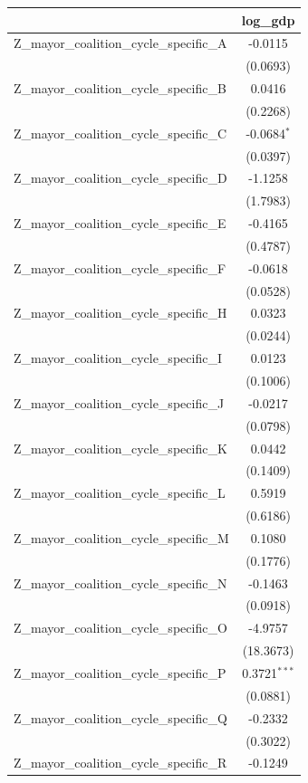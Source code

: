 \begin{tabular}{lc}
\toprule
 & log\_gdp \\
\midrule
Z\_mayor\_coalition\_cycle\_specific\_A & -0.0115 \\
 & (0.0693) \\
Z\_mayor\_coalition\_cycle\_specific\_B & 0.0416 \\
 & (0.2268) \\
Z\_mayor\_coalition\_cycle\_specific\_C & -0.0684$^{*}$ \\
 & (0.0397) \\
Z\_mayor\_coalition\_cycle\_specific\_D & -1.1258 \\
 & (1.7983) \\
Z\_mayor\_coalition\_cycle\_specific\_E & -0.4165 \\
 & (0.4787) \\
Z\_mayor\_coalition\_cycle\_specific\_F & -0.0618 \\
 & (0.0528) \\
Z\_mayor\_coalition\_cycle\_specific\_H & 0.0323 \\
 & (0.0244) \\
Z\_mayor\_coalition\_cycle\_specific\_I & 0.0123 \\
 & (0.1006) \\
Z\_mayor\_coalition\_cycle\_specific\_J & -0.0217 \\
 & (0.0798) \\
Z\_mayor\_coalition\_cycle\_specific\_K & 0.0442 \\
 & (0.1409) \\
Z\_mayor\_coalition\_cycle\_specific\_L & 0.5919 \\
 & (0.6186) \\
Z\_mayor\_coalition\_cycle\_specific\_M & 0.1080 \\
 & (0.1776) \\
Z\_mayor\_coalition\_cycle\_specific\_N & -0.1463 \\
 & (0.0918) \\
Z\_mayor\_coalition\_cycle\_specific\_O & -4.9757 \\
 & (18.3673) \\
Z\_mayor\_coalition\_cycle\_specific\_P & 0.3721$^{***}$ \\
 & (0.0881) \\
Z\_mayor\_coalition\_cycle\_specific\_Q & -0.2332 \\
 & (0.3022) \\
Z\_mayor\_coalition\_cycle\_specific\_R & -0.1249 \\

\end{tabular}

